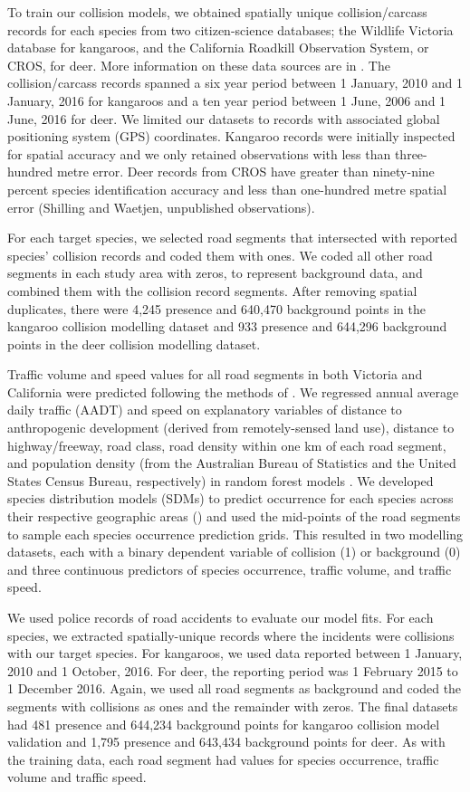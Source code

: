 To train our collision models, we obtained spatially unique collision/carcass records for each species from two citizen-science databases; the Wildlife Victoria database for kangaroos, and the California Roadkill Observation System, or CROS, \citep[see][]{shil15a} for deer. More information on these data sources are in . The collision/carcass records spanned a six year period between 1 January, 2010 and 1 January, 2016 for kangaroos and a ten year period between 1 June, 2006 and 1 June, 2016 for deer. We limited our datasets to records with associated global positioning system (GPS) coordinates. Kangaroo records were initially inspected for spatial accuracy and we only retained observations with less than three-hundred metre error. Deer records from CROS have greater than ninety-nine percent species identification accuracy and less than one-hundred metre spatial error (Shilling and Waetjen, unpublished observations).

For each target species, we selected road segments that intersected with reported species’ collision records and coded them with ones. We coded all other road segments in each study area with zeros, to represent background data, and combined them with the collision record segments.  After removing spatial duplicates, there were 4,245 presence and 640,470 background points in the kangaroo collision modelling dataset and 933 presence and 644,296 background points in the deer collision modelling dataset.

Traffic volume and speed values for all road segments in both Victoria and California were predicted following the methods of .  We regressed annual average daily traffic (AADT) and speed on explanatory variables of distance to anthropogenic development (derived from remotely-sensed land use), distance to highway/freeway, road class, road density within one km of each road segment, and population density (from the Australian Bureau of Statistics and the United States Census Bureau, respectively) in random forest models \citep{brei01}. We developed species distribution models (SDMs) to predict occurrence for each species across their respective geographic areas () and used the mid-points of the road segments to sample each species occurrence prediction grids. This resulted in two modelling datasets, each with a binary dependent variable of collision (1) or background (0) and three continuous predictors of species occurrence, traffic volume, and traffic speed.  

We used police records of road accidents to evaluate our model fits.  For each species, we extracted spatially-unique records where the incidents were collisions with our target species.  For kangaroos, we used data reported between 1 January, 2010 and 1 October, 2016. For deer, the reporting period was 1 February 2015 to 1 December 2016.  Again, we used all road segments as background and coded the segments with collisions as ones and the remainder with zeros. The final datasets had 481 presence and 644,234 background points for kangaroo collision model validation and 1,795 presence and 643,434 background points for deer. As with the training data, each road segment had values for species occurrence, traffic volume and traffic speed.

